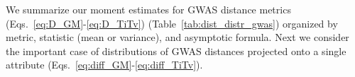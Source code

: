 \documentclass[aos]{imsart}
\begin{document}
We summarize our moment estimates for GWAS distance metrics (Eqs.~\ref{eq:D_GM}-\ref{eq:D_TiTv}) (Table~\ref{tab:dist_distr_gwas}) organized by metric, statistic (mean or variance), and asymptotic formula. Next we consider the important case of distributions of GWAS distances projected onto a single attribute (Eqs.~\ref{eq:diff_GM}-\ref{eq:diff_TiTv}).


%
\end{document}
